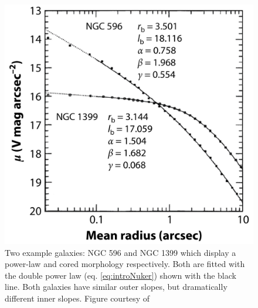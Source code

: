 {{	\begin{figure}
		\centering
		\includegraphics[width=\textwidth]{introduction/exampleCorePower.jpeg}
		\caption[Example cored and power-law surface brightness profile]{Two example galaxies: NGC 596 and NGC 1399 which display a power-law and cored morphology respectively. Both are fitted with the double power law (eq. \ref{eq:introNuker}) shown with the black line. Both galaxies have similar outer slopes, but dramatically different inner slopes. Figure courtesy of \citet{Lauer1995}}
		\label{fig:introCorePower}
	\end{figure}

}}
